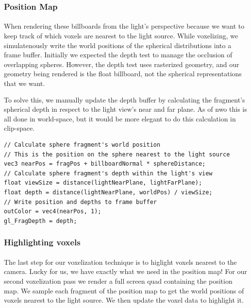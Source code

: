 \newpage
\subsubsection{Position Map}\paragraph{}
When rendering these billboards from the light's perspective because we want to keep track of which voxels are nearest to the light source. While voxelizing, we simulatenously write the world positions of the spherical distributions into a frame buffer. 
Initially we expected the depth test to manage the occlusion of overlapping spheres. 
However, the depth test uses rasterized geometry, and our geometry being rendered is the float billboard, not the spherical representations that we want. 

To solve this, we manually update the depth buffer by calculating the fragment's spherical depth in respect to the light view's near and far plane. As of nwo this is all done in world-space, but it would be more elegant to do this calculation in clip-space.
\begin{lstlisting}[caption={first\_voxelize.glsl, 60}]
// Calculate sphere fragment's world position 
// This is the position on the sphere nearest to the light source
vec3 nearPos = fragPos + billboardNormal * sphereDistance;
// Calculate sphere fragment's depth within the light's view
float viewSize = distance(lightNearPlane, lightFarPlane);
float depth = distance(lightNearPlane, worldPos) / viewSize;
// Write position and depths to frame buffer
outColor = vec4(nearPos, 1);
gl_FragDepth = depth;
\end{lstlisting}


\subsubsection{Highlighting voxels}\paragraph{}
The last step for our voxelization technique is to higlight voxels nearest to the camera. Lucky for us, we have exactly what we need in the position map! 
For our second voxelization pass we render a full screen quad containing the position map. We sample each fragment of the position map to get the world positions of voxels nearest to the light source. We then update the voxel data to highlight it. 

